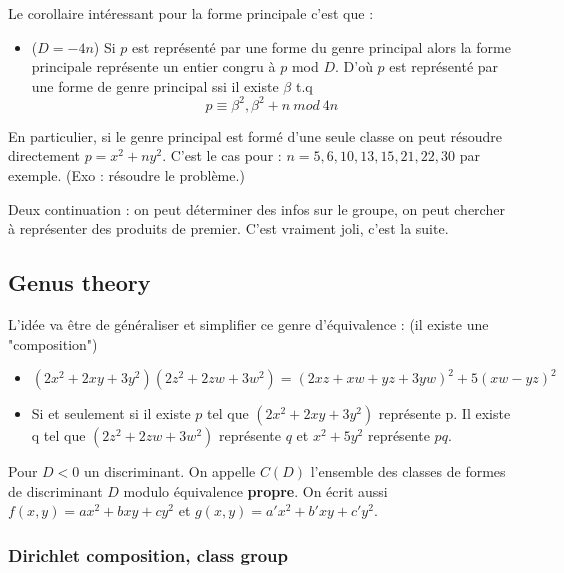 \documentclass[12pt]{article}
\theoremstyle{plain}
\begin{document}
Le corollaire intéressant pour la forme principale c'est que : 
\begin{itemize}
    \item ($D=-4n$) Si $p$ est représenté par une forme du genre principal alors la forme principale représente un entier congru 
    à $p$ mod $D$. D'où $p$ est représenté par une forme de genre principal ssi il existe $\beta$ t.q $$p\equiv\beta^2,\beta^2+n~mod~4n$$
\end{itemize}

En particulier, si le genre principal est formé d'une seule classe on peut résoudre directement $p=x^2+ny^2$. C'est le cas pour :
$n=5, 6, 10, 13, 15, 21, 22, 30$ par exemple. (Exo : résoudre le problème.)

Deux continuation : on peut déterminer des infos sur le groupe, on peut chercher à représenter des produits de premier.
C'est vraiment joli, c'est la suite.  
\newpage
\subsection{Genus theory}
L'idée va être de généraliser et simplifier ce genre d'équivalence : (il existe une "composition")
\begin{itemize}
    \item $(2x^2+2xy+3y^2)(2z^2+2zw+3w^2)=(2xz+xw+yz+3yw)^2+5(xw-yz)^2$
    \item Si et seulement si il existe $p$ tel que $(2x^2+2xy+3y^2)$ représente p. Il existe q tel que $(2z^2+2zw+3w^2)$ représente $q$ et $x^2+5y^2$ représente $pq$.

\end{itemize}

Pour $D<0$ un discriminant. On appelle $C(D)$ l'ensemble des classes de formes de discriminant $D$ modulo équivalence \textbf{propre}.
On écrit aussi $f(x,y)=ax^2+bxy+cy^2$ et $g(x,y)=a'x^2+b'xy+c'y^2$.
\subsubsection{Dirichlet composition, class group}
\end{document}
